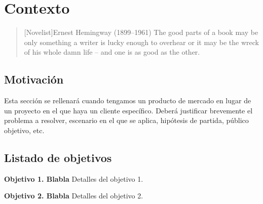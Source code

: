 \chapter{Contexto}

\begin{quotation}[Novelist]{Ernest Hemingway (1899--1961)}
The good parts of a book may be only something a writer is lucky enough to overhear or it may be the wreck of his whole damn life -- and one is as good as the other.
\end{quotation}

\begin{abstract}
Aqu\'i mal un breve resumen del capítulo.
\end{abstract}

\section{Motivación}
Esta sección se rellenará cuando tengamos un producto de mercado en lugar de un proyecto en el que haya un cliente específico. Deberá justificar brevemente el problema a resolver, escenario en el que se aplica, hipótesis de partida, público objetivo, etc.

\section{Listado de objetivos}

\begin{description}
\item \textbf{Objetivo 1. Blabla} Detalles del objetivo 1.
\item \textbf{Objetivo 2. Blabla} Detalles del objetivo 2.
\end{description}